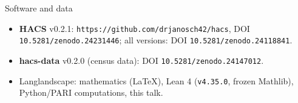 \begin{frame}{Software and data}
  \small
  \begin{itemize}
    \item \textbf{HACS} v0.2.1: \texttt{https://github.com/drjanosch42/hacs}, DOI \texttt{10.5281/zenodo.24231446}; all versions: DOI \texttt{10.5281/zenodo.24118841}.
    \item \textbf{hacs-data} v0.2.0 (census data): DOI \texttt{10.5281/zenodo.24147012}.
    \item Langlandscape: mathematics (LaTeX), Lean 4 (\texttt{v4.35.0}, frozen Mathlib), Python/PARI computations, this talk.
  \end{itemize}
\end{frame}
